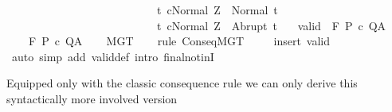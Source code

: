 \begin{isabellebody}
\ \ \ \ \ \ \ \ \ \ \ \ \ \ \ \ \ \ \ \ \ \ \ \ \ \ \ {\isacharbraceleft}t{\isachardot}\ {\isasymGamma}{\isasymturnstile}{\isasymlangle}c{\isacharcomma}Normal\ Z{\isasymrangle}\ {\isasymRightarrow}\ Normal\ t{\isacharbraceright}{\isacharcomma}\isanewline
\ \ \ \ \ \ \ \ \ \ \ \ \ \ \ \ \ \ \ \ \ \ \ \ \ \ \ {\isacharbraceleft}t{\isachardot}\ {\isasymGamma}{\isasymturnstile}{\isasymlangle}c{\isacharcomma}Normal\ Z{\isasymrangle}\ {\isasymRightarrow}\ Abrupt\ t{\isacharbraceright}{\isachardoublequoteclose}\isanewline
\ \ \ valid{\isacharcolon}\ {\isachardoublequoteopen}{\isasymGamma}\ {\isasymTurnstile}\isactrlbsub {\isacharslash}F\isactrlesub \ P\ c\ Q{\isacharcomma}A{\isachardoublequoteclose}\ \isanewline
\ \ \ {\isachardoublequoteopen}{\isasymGamma}{\isacharcomma}{\isacharbraceleft}{\isacharbraceright}\ {\isasymturnstile}\isactrlbsub {\isacharslash}F\isactrlesub \ P\ c\ Q{\isacharcomma}A{\isachardoublequoteclose}\isanewline
%
\isadelimproof
\ \ %
\endisadelimproof
%
\isatagproof
{}\isamarkupfalse%
\ MGT\isanewline
\ \ \isamarkupfalse%
\ {\isacharparenleft}rule\ ConseqMGT{\isacharparenright}\ \isanewline
\ \ \isamarkupfalse%
\ {\isacharparenleft}insert\ valid{\isacharparenright}\isanewline
\ \ \isamarkupfalse%
\ {\isacharparenleft}auto\ simp\ add{\isacharcolon}\ valid{\isacharunderscore}def\ intro{\isacharbang}{\isacharcolon}\ final{\isacharunderscore}notinI{\isacharparenright}\isanewline
\ \ \isamarkupfalse%
%
\endisatagproof
{\isafoldproof}%
%
\isadelimproof
%
\endisadelimproof
%
\begin{isamarkuptext}%
Equipped only with the classic consequence rule 
        we can only derive this syntactically more involved version

\end{isamarkuptext}
\end{isabellebody}
